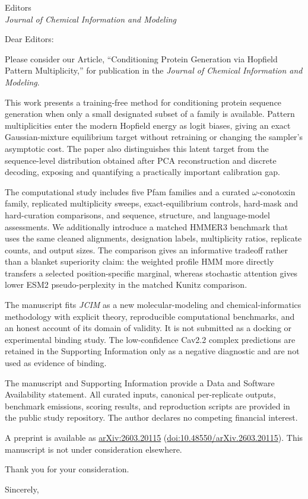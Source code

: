 \documentclass[10pt]{letter}
\date{August 11, 2026}
\begin{document}
\begin{letter}{%
Editors\\
\textit{Journal of Chemical Information and Modeling}}

\opening{Dear Editors:}

Please consider our Article, ``Conditioning Protein Generation via Hopfield Pattern
Multiplicity,'' for publication in the \textit{Journal of Chemical Information and
Modeling}.

This work presents a training-free method for conditioning protein sequence generation when
only a small designated subset of a family is available. Pattern multiplicities enter the
modern Hopfield energy as logit biases, giving an exact Gaussian-mixture equilibrium target
without retraining or changing the sampler's asymptotic cost. The paper also distinguishes
this latent target from the sequence-level distribution obtained after PCA reconstruction and
discrete decoding, exposing and quantifying a practically important calibration gap.

The computational study includes five Pfam families and a curated $\omega$-conotoxin family,
replicated multiplicity sweeps, exact-equilibrium controls, hard-mask and hard-curation
comparisons, and sequence, structure, and language-model assessments. We additionally
introduce a matched HMMER3 benchmark that uses the same cleaned alignments, designation
labels, multiplicity ratios, replicate counts, and output sizes. The comparison gives an
informative tradeoff rather than a blanket superiority claim: the weighted profile HMM more
directly transfers a selected position-specific marginal, whereas stochastic attention gives
lower ESM2 pseudo-perplexity in the matched Kunitz comparison.

The manuscript fits \textit{JCIM} as a new molecular-modeling and chemical-informatics
methodology with explicit theory, reproducible computational benchmarks, and an honest
account of its domain of validity. It is not submitted as a docking or experimental binding
study. The low-confidence Cav2.2 complex predictions are retained in the Supporting
Information only as a negative diagnostic and are not used as evidence of binding.

The manuscript and Supporting Information provide a Data and Software Availability
statement. All curated inputs, canonical per-replicate outputs, benchmark emissions, scoring
results, and reproduction scripts are provided in the public study repository. The author
declares no competing financial interest.

A preprint is available as
\href{https://arxiv.org/abs/2603.20115}{arXiv:2603.20115}
(\href{https://doi.org/10.48550/arXiv.2603.20115}{doi:10.48550/arXiv.2603.20115}).
This manuscript is not under consideration elsewhere.

Thank you for your consideration.

\closing{Sincerely,}

\end{letter}
\end{document}
